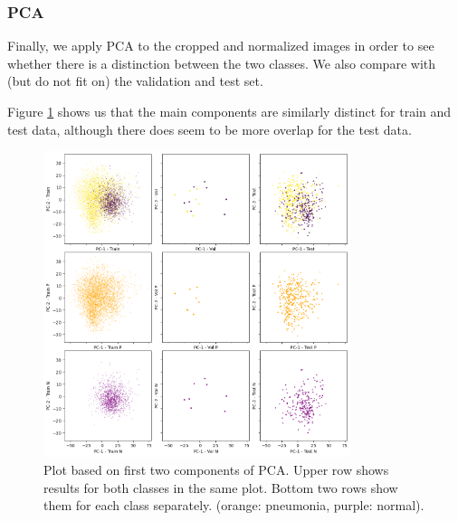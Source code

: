 \subsubsection{PCA}
Finally, we apply PCA to the cropped and normalized images in order to see whether there is a distinction between the two classes. We also compare with (but do not fit on) the validation and test set.

Figure \ref{fig:PCA} shows us that the main components are similarly distinct for train and test data, although there does seem to be more overlap for the test data.

\begin{figure}
    \centering
    \includegraphics[width=0.8\textwidth]{images/PCA.png}
    \caption{Plot based on first two components of PCA. Upper row shows results for both classes in the same plot. Bottom two rows show them for each class separately. (orange: pneumonia, purple: normal).}
    \label{fig:PCA}
\end{figure}
